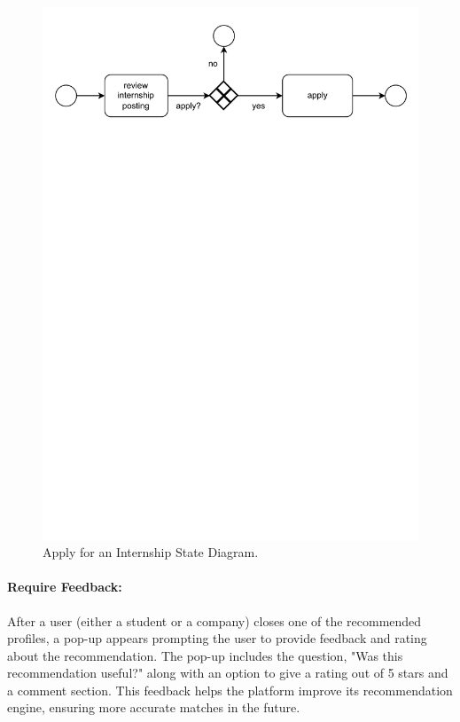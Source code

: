 \begin{figure}[H]
    \begin{center}
        \includegraphics[width=\linewidth]{Images/StateDiagram/Apply.pdf}
        \caption{Apply for an Internship State Diagram.}
        \label{fig:Apply_state_diag}%
    \end{center}
\end{figure}


\paragraph{Require Feedback:} After a user (either a student or a
  company) closes one of the recommended profiles, a pop-up appears
  prompting the user to provide feedback and rating about the
  recommendation. The pop-up includes the question, "Was this recommendation useful?" along with an option to give a rating out of 5 stars and a comment section. This feedback helps the platform improve its recommendation engine, ensuring more accurate matches in the future.

